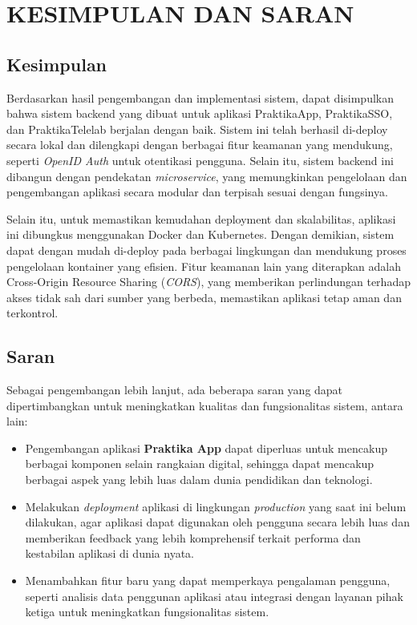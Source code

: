 \chapter{KESIMPULAN DAN SARAN}


\section{Kesimpulan}

Berdasarkan hasil pengembangan dan implementasi sistem, dapat disimpulkan bahwa sistem backend yang dibuat untuk aplikasi PraktikaApp, PraktikaSSO, dan PraktikaTelelab berjalan dengan baik. Sistem ini telah berhasil di-deploy secara lokal dan dilengkapi dengan berbagai fitur keamanan yang mendukung, seperti \emph{OpenID Auth} untuk otentikasi pengguna. Selain itu, sistem backend ini dibangun dengan pendekatan \emph{microservice}, yang memungkinkan pengelolaan dan pengembangan aplikasi secara modular dan terpisah sesuai dengan fungsinya.

Selain itu, untuk memastikan kemudahan deployment dan skalabilitas, aplikasi ini dibungkus menggunakan Docker dan Kubernetes. Dengan demikian, sistem dapat dengan mudah di-deploy pada berbagai lingkungan dan mendukung proses pengelolaan kontainer yang efisien. Fitur keamanan lain yang diterapkan adalah Cross-Origin Resource Sharing (\emph{CORS}), yang memberikan perlindungan terhadap akses tidak sah dari sumber yang berbeda, memastikan aplikasi tetap aman dan terkontrol.

\section{Saran}

Sebagai pengembangan lebih lanjut, ada beberapa saran yang dapat dipertimbangkan untuk meningkatkan kualitas dan fungsionalitas sistem, antara lain:

\begin{itemize}
    \item Pengembangan aplikasi \textbf{Praktika App} dapat diperluas untuk mencakup berbagai komponen selain rangkaian digital, sehingga dapat mencakup berbagai aspek yang lebih luas dalam dunia pendidikan dan teknologi.
    \item Melakukan \emph{deployment} aplikasi di lingkungan \emph{production} yang saat ini belum dilakukan, agar aplikasi dapat digunakan oleh pengguna secara lebih luas dan memberikan feedback yang lebih komprehensif terkait performa dan kestabilan aplikasi di dunia nyata.
    \item Menambahkan fitur baru yang dapat memperkaya pengalaman pengguna, seperti analisis data penggunan aplikasi atau integrasi dengan layanan pihak ketiga untuk meningkatkan fungsionalitas sistem.
\end{itemize}
